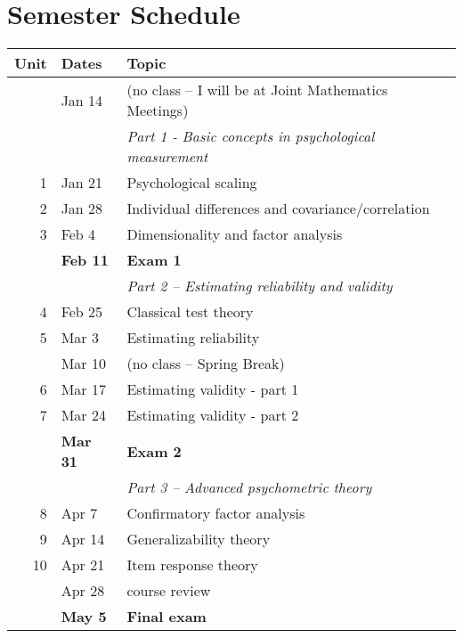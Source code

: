 \documentclass[10pt]{article}
\begin{document}
\section*{Semester Schedule}
\label{sec:org4c2cd54}
\begin{center}
\begin{tabular}{rll}
Unit & Dates & Topic\\
\hline
 & Jan 14 & (no class -- I will be at Joint Mathematics Meetings)\\
 &  & \emph{Part 1 - Basic concepts in psychological measurement}\\
1 & Jan 21 & Psychological scaling\\
2 & Jan 28 & Individual differences and covariance/correlation\\
3 & Feb 4 & Dimensionality and factor analysis\\
 & \textbf{Feb 11} & \textbf{Exam 1}\\
\hline
 &  & \emph{Part 2 -- Estimating reliability and validity}\\
4 & Feb 25 & Classical test theory\\
5 & Mar 3 & Estimating reliability\\
 & Mar 10 & (no class -- Spring Break)\\
6 & Mar 17 & Estimating validity - part 1\\
7 & Mar 24 & Estimating validity - part 2\\
 & \textbf{Mar 31} & \textbf{Exam 2}\\
\hline
 &  & \emph{Part 3 -- Advanced psychometric theory}\\
8 & Apr 7 & Confirmatory factor analysis\\
9 & Apr 14 & Generalizability theory\\
10 & Apr 21 & Item response theory\\
 & Apr 28 & course review\\
 & \textbf{May 5} & \textbf{Final exam}\\
\hline
\end{tabular}
\end{center}
\end{document}
